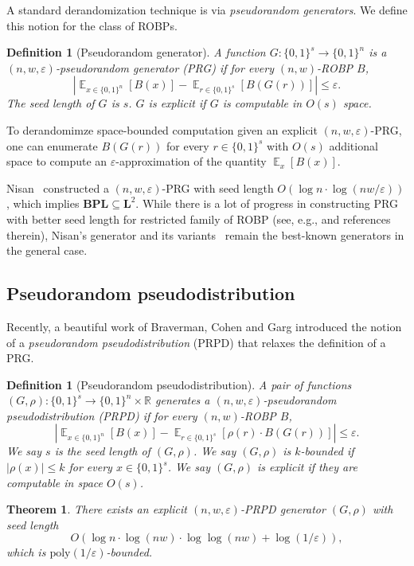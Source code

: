 \documentclass[10pt,a4paper]{article}
\newtheorem{definition}[theorem]{Definition}
\newtheorem{THM}[theorem]{Theorem}
\DeclareMathOperator*{\Ex}{\mathbb E}
\newcommand{\ex}[2][]{\Ex_{#1}\left[#2\right]}
\newcommand{\abs}[1]{\left|#1\right|}
\newcommand{\bbR}{\mathbb R}
\newcommand{\bits}[1]{\{0,1\}^{#1}}
\newcommand{\eps}{\varepsilon}
\newcommand{\poly}{\mathrm{poly}}
\newcommand{\BPL}{\mathbf{BPL}}
\renewcommand{\L}{\mathbf{L}}
\begin{document}
A standard derandomization technique is via \emph{pseudorandom generators}. We define this notion for the class of ROBPs.

\begin{definition}[Pseudorandom generator]
A function $G:\bits{s}\to\bits{n}$ is a $(n,w,\eps)$-pseudorandom generator (PRG) if for every $(n,w)$-ROBP $B$,
$$\abs{\ex[x\in\bits{n}]{B(x)}-\ex[r\in\bits{s}]{B(G(r))}}\le\eps.$$
The \emph{seed length} of $G$ is $s$.   $G$ is explicit if $G$ is computable in $O(s)$ space.
\end{definition}
To derandomimze  space-bounded computation  given an explicit $(n,w,\eps)$-PRG, one can enumerate $B(G(r))$ for every $r\in\bits{s}$ with $O(s)$ additional space to compute an $\eps$-approximation of the quantity $\ex[x]{B(x)}$. 

Nisan~\cite{Nis92} constructed a $(n,w,\eps)$-PRG with seed length $O(\log n \cdot \log (nw/\eps))$, which implies $\BPL\subseteq \L^2$.   While there is a lot of progress in constructing PRG with better seed length for restricted family of ROBP (see, e.g., \cite{NZ96,Arm98,BV10,BDVY13,BRRY14,KNP11,De11,Ste12,MRT19} and references therein), Nisan's generator and its variants~\cite{Nis92,INW94,RR99} remain the best-known generators in the general case.
\subsection{Pseudorandom pseudodistribution }
Recently, a beautiful work of Braverman, Cohen and Garg \cite{BCG18} introduced the notion of a \emph{pseudorandom pseudodistribution} (PRPD)  that relaxes the definition of a PRG.
\begin{definition}[Pseudorandom pseudodistribution]
A pair of functions $(G,\rho):\bits{s}\to \bits{n}\times \bbR$ generates a $(n,w,\eps)$-pseudorandom pseudodistribution (PRPD) if for every $(n,w)$-ROBP $B$,
$$\abs{\ex[x\in\bits{n}]{B(x)}-\ex[r\in\bits{s}]{\rho(r)\cdot B(G(r))}}\le\eps.$$
We say $s$ is the \emph{seed length} of $(G,\rho)$. We say $(G,\rho)$ is $k$-bounded if $|\rho(x)|\le k$ for every $x\in\bits{s}$. We say $(G,\rho)$ is explicit if they are computable in space $O(s)$.
\end{definition}

\begin{THM}
\label{thm:main}
There exists an explicit $(n,w,\eps)$-PRPD generator $(G,\rho)$ with seed length
$$O\left(\log n\cdot \log(nw)\cdot \log\log (nw) + \log(1/\eps)\right),$$
which is $\poly(1/\eps)$-bounded.
\end{THM}
\end{document}
